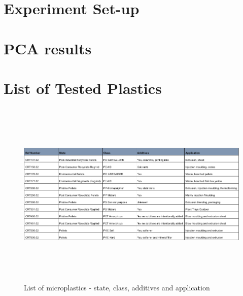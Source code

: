 \begin{appendices}

\chapter{Experiment Set-up}
\label{app:method}


\chapter{PCA results}
\label{app:PCA_res_full}

\chapter{List of Tested Plastics}
\label{app:list_plast}




\begin{figure}
    \centering
    \includegraphics[height = 9cm, angle = 90]{Images/order.png}
    \caption{List of microplastics - state, class, additives and application}
    \label{fig:order}
\end{figure}





\end{appendices}
